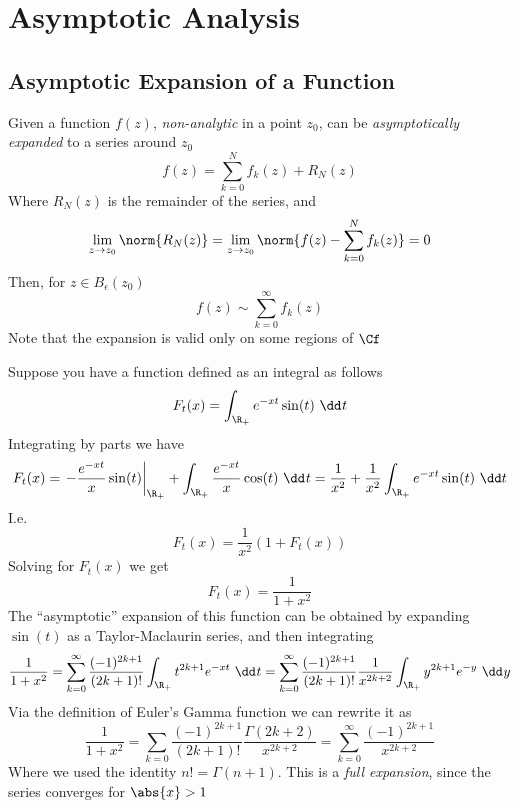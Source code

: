 \documentclass[../mmf.tex]{subfiles}
\begin{document}
\chapter{Asymptotic Analysis}
\section{Asymptotic Expansion of a Function}
\begin{dfn}
	Given a function $f(z)$, \textit{non-analytic} in a point $z_0$, can be \textit{asymptotically expanded} to a series around $z_0$
	\begin{equation*}
		f(z)=\sum_{k=0}^{N}f_{k}(z)+R_{N}(z)
	\end{equation*}
	Where $R_N(z)$ is the remainder of the series, and
	\begin{equation*}
		\lim_{z\to z_0}\norm{R_N(z)}=\lim_{z\to z_0}\norm{f(z)-\sum_{k=0}^{N}f_{k}(z)}=0
	\end{equation*}
	Then, for $z\in B_{\epsilon}(z_0)$
	\begin{equation*}
		f(z)\sim\sum_{k=0}^{\infty}f_{k}(z)
	\end{equation*}
	Note that the expansion is valid only on some regions of $\Cf$
\end{dfn}
\begin{eg}
	Suppose you have a function defined as an integral as follows
	\begin{equation*}
		F_{t}(x)=\int_{\R_+}^{}e^{-xt}\sin(t)\ \dd^{}{t}
	\end{equation*}
	Integrating by parts we have
	\begin{equation*}
		F_{t}(x)=\left.-\frac{e^{-xt}}{x}\sin(t)\right|_{\R_+}+\int_{\R_+}^{}\frac{e^{-xt}}{x}\cos(t)\ \dd^{}{t}=\frac{1}{x^2}+\frac{1}{x^2}\int_{\R_+}e^{-xt}\sin(t)\ \dd t
	\end{equation*}
	I.e.
	\begin{equation*}
		F_t(x)=\frac{1}{x^2}\left( 1+F_t(x) \right)
	\end{equation*}
	Solving for $F_t(x)$ we get
	\begin{equation*}
		F_{t}(x)=\frac{1}{1+x^2}
	\end{equation*}
	The ``asymptotic'' expansion of this function can be obtained by expanding $\sin(t)$ as a Taylor-Maclaurin series, and then integrating 
	\begin{equation*}
		\frac{1}{1+x^2}=\sum_{k=0}^{\infty}\frac{(-1)^{2k+1}}{(2k+1)!}\int_{\R_+}^{}t^{2k+1}e^{-xt}\ \dd^{}{t}=\sum_{k=0}^{\infty}\frac{(-1)^{2k+1}}{(2k+1)!}\frac{1}{x^{2k+2}}\int_{\R_+}^{}y^{2k+1}e^{-y}\ \dd^{}{y}
	\end{equation*}
	Via the definition of Euler's Gamma function we can rewrite it as
	\begin{equation*}
		\frac{1}{1+x^2}=\sum_{k=0}\frac{(-1)^{2k+1}}{(2k+1)!}\frac{\Gamma\left( 2k+2 \right)}{x^{2k+2}}=\sum_{k=0}^{\infty}\frac{(-1)^{2k+1}}{x^{2k+2}}
	\end{equation*}
	Where we used the identity $n!=\Gamma(n+1)$. This is a \textit{full expansion}, since the series converges for $\abs{x}>1$
\end{eg}
\end{document}
